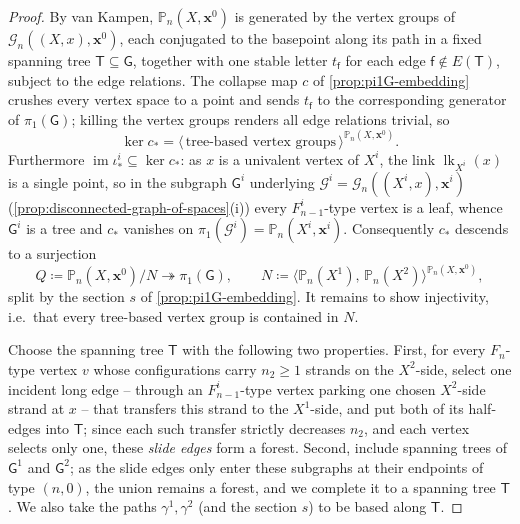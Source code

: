 \documentclass[reqno]{amsart}
\theoremstyle{definition}
\newcommand\bfx{\mathbf{x}}
\newcommand\cG{\mathcal{G}}
\newcommand\sfG{\mathsf{G}}
\newcommand\sfT{\mathsf{T}}
\newcommand\sff{\mathsf{f}}
\newcommand{\PB}{\mathbb{P}}
\newcommand{\im}{\operatorname{im}}
\newcommand{\co}[1]{\mathopen{\langle}#1\mathclose{\rangle}} %
\newcommand{\base}{\bfx^0}
\DeclareMathOperator{\lk}{lk}
\numberwithin{equation}{section}
\begin{document}
\begin{proof}
By van Kampen, \(\PB_n(X,\base)\) is generated by the vertex
groups of \(\cG_n((X,x),\base)\), each conjugated to the basepoint
along its path in a fixed spanning tree \(\sfT\subseteq\sfG\),
together with one stable letter \(t_\sff\) for each edge
\(\sff\notin E(\sfT)\), subject to the edge relations. The collapse map
\(c\) of \cref{prop:pi1G-embedding} crushes every vertex space to
a point and sends \(t_\sff\) to the corresponding generator of
\(\pi_1(\sfG)\); killing the vertex groups renders all edge
relations trivial, so
\[
\ker c_\ast =
\co{\,\text{tree-based vertex groups}\,}^{\PB_n(X,\base)} .
\]
Furthermore \(\im\iota^i_\ast\subseteq\ker c_\ast\): as \(x\) is a
univalent vertex of \(X^i\), the link \(\lk_{X^i}(x)\) is a single
point, so in the subgraph \(\sfG^i\) underlying
\(\cG^i=\cG_n((X^i,x),\bfx^i)\)
(\cref{prop:disconnected-graph-of-spaces}(i)) every
\(F^i_{n-1}\)-type vertex is a leaf, whence \(\sfG^i\) is a tree
and \(c_\ast\) vanishes on \(\pi_1(\cG^i)=\PB_n(X^i,\bfx^i)\).
Consequently \(c_\ast\) descends to a surjection
\[
Q\coloneqq\PB_n(X,\base)\big/N
\twoheadrightarrow\pi_1(\sfG),
\qquad
N\coloneqq\co{\PB_n(X^1),\,\PB_n(X^2)}^{\PB_n(X,\base)},
\]
split by the section \(s\) of \cref{prop:pi1G-embedding}. It
remains to show injectivity, i.e.\ that every tree-based vertex
group is contained in \(N\).

Choose the spanning tree \(\sfT\) with the following two
properties. First, for every \(F_n\)-type vertex \(v\) whose
configurations carry \(n_2\geq1\) strands on the \(X^2\)-side,
select one incident long edge -- through an \(F^i_{n-1}\)-type
vertex parking one chosen \(X^2\)-side strand at \(x\) -- that
transfers this strand to the \(X^1\)-side, and put both of its
half-edges into \(\sfT\); since each such transfer strictly
decreases \(n_2\), and each vertex selects only one, these
\emph{slide edges} form a forest. Second, include spanning trees
of \(\sfG^1\) and \(\sfG^2\); as the slide edges only enter these
subgraphs at their endpoints of type \((n,0)\), the union remains
a forest, and we complete it to a spanning tree \(\sfT\). We also
take the paths \(\gamma^1,\gamma^2\) (and the section \(s\)) to be
based along \(\sfT\).


\end{proof}
\end{document}
